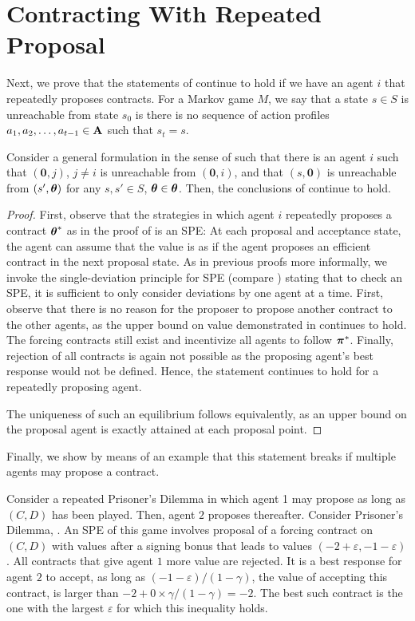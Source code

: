 \section{Contracting With Repeated Proposal}
Next, we prove that the statements of  continue to hold if we have an agent $i$ that repeatedly proposes contracts. For a Markov game $M$, we say that a state $s \in S$ is unreachable from state $s_0$ is there is no sequence of action profiles $\mathbf \mathbf a_1, \mathbf \mathbf a_2, \dots, \mathbf \mathbf a_{t-1} \in \mathbf A$ such that  $s_t = s$. 
\begin{proposition}
Consider a general formulation in the sense of  such that there is an agent $i$ such that $(\boldsymbol 0, j)$, $j \neq i$ is unreachable from $(\boldsymbol 0, i)$, and that $(s, \boldsymbol 0)$ is unreachable from $(s', \boldsymbol{\boldsymbol{\theta}})$ for any $s, s' \in S$, $\boldsymbol{\boldsymbol{\theta}} \in  \boldsymbol{\boldsymbol{\theta}}$. Then, the conclusions of  continue to hold.
\end{proposition}
\begin{proof}
First, observe that the strategies in which agent $i$ repeatedly proposes a contract $\boldsymbol{\boldsymbol{\theta}}^*$ as in the proof of  is an SPE: At each proposal and acceptance state, the agent can assume that the value is as if the agent proposes an efficient contract in the next proposal state. As in previous proofs more informally, we invoke the single-deviation principle for SPE (compare \cite{osborne1994course}) stating that to check an SPE, it is sufficient to only consider deviations by one agent at a time. First, observe that there is no reason for the proposer to propose another contract to the other agents, as the upper bound on value demonstrated in  continues to hold. The forcing contracts still exist and incentivize all agents to follow $\boldsymbol{\pi}^*$. Finally, rejection of all contracts is again not possible as the proposing agent's best response would not be defined. Hence, the statement continues to hold for a repeatedly proposing agent.

The uniqueness of such an equilibrium follows equivalently, as an upper bound on the proposal agent is exactly attained at each proposal point.
\end{proof}
Finally, we show by means of an example that this statement breaks if multiple agents may propose a contract.
\begin{example}\label{prop:different}
Consider a repeated Prisoner's Dilemma in which agent 1 may propose as long as $(C,D)$ has been played. Then, agent $2$ proposes thereafter. Consider Prisoner's Dilemma, . An SPE of this game involves proposal of a forcing contract on $(C,D)$ with values after a signing bonus that leads to values $(-2 + \varepsilon,-1 - \varepsilon)$. All contracts that give agent $1$ more value are rejected. It is a best response for agent $2$ to accept, as long as $(-1-\varepsilon)/(1-\gamma)$, the value of accepting this contract, is larger than $-2 + 0 \times \gamma/(1-\gamma) = -2$. The best such contract is the one with the largest $\varepsilon$ for which this inequality holds.
\end{example}

